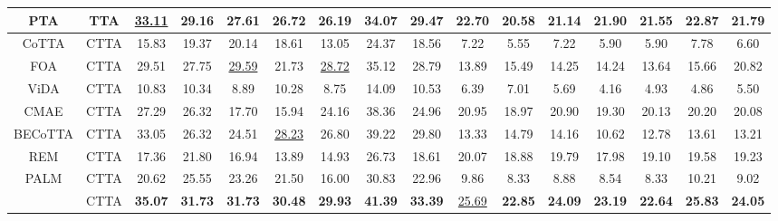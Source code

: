 \begin{table}[t]
{\begin{tabular}{c||c||cccccc|c||cccccc|c}
        PTA & TTA 
        & \underline{33.11} & 29.16 & 27.61 & 26.72 & 26.19 & 34.07 & 29.47  & 22.70 & 20.58 & 21.14 & 21.90 & 21.55 & 22.87 & 21.79        
        \\  \midrule

        CoTTA & CTTA  
        & 15.83 & 19.37 & 20.14 & 18.61 & 13.05 & 24.37 & 18.56  & 7.22 & 5.55 & 7.22 & 5.90 & 5.90 & 7.78 & 6.60
        \\

        FOA & CTTA 
        & 29.51 & 27.75 & \underline{29.59} & 21.73 & \underline{28.72} & 35.12 & 28.79  & 13.89 & 15.49 & 14.25 & 14.24 & 13.64 & 15.66 & 20.82      
        \\

        ViDA & CTTA 
        & 10.83 & 10.34 &  8.89 & 10.28 &  8.75 & 14.09 & 10.53  & 6.39 & 7.01 & 5.69 & 4.16 & 4.93 & 4.86 & 5.50
        \\

        CMAE & CTTA  & 27.29 & 26.32 & 17.70 & 15.94 & 24.16 & 38.36 & 24.96  & 20.95 & 18.97 & 20.90 & 19.30 & 20.13 & 20.20 & 20.08
        
        \\

        BECoTTA & CTTA 
        & 33.05 & 26.32 & 24.51 & \underline{28.23} & 26.80 & 39.22 & 29.80  & 13.33 & 14.79 & 14.16 & 10.62 & 12.78 & 13.61 & 13.21
        \\

        REM & CTTA  
        & 17.36 & 21.80 & 16.94 & 13.89 & 14.93 & 26.73 & 18.61  & 20.07 & 18.88 & 19.79 & 17.98 & 19.10 & 19.58 & 19.23        
        \\

        PALM & CTTA 
        & 20.62 & 25.55 & 23.26 & 21.50 & 16.00 & 30.83 & 22.96  & 9.86 & 8.33 & 8.88 & 8.54 & 8.33 & 10.21 & 9.02
        \\ \midrule

        \textbf{\M} & CTTA  
        & \textbf{35.07} & \textbf{31.73} & \textbf{31.73} & \textbf{30.48} & \textbf{29.93} & \textbf{41.39} & \textbf{33.39} 
        & \underline{25.69} & \textbf{22.85} & \textbf{24.09} & \textbf{23.19} & \textbf{22.64} & \textbf{25.83} & \textbf{24.05}
        \\


    \bottomrule
    \end{tabular}
    }
\end{table}


